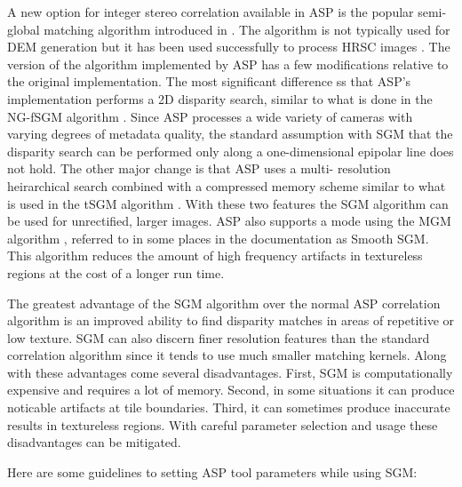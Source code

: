 A new option for integer stereo correlation available in ASP is the 
popular semi-global matching algorithm introduced in 
\citep{hirschmuller_sgm_original}.  The algorithm is not typically used for
DEM generation but it has been used successfully to process HRSC images
\citep{hirschmuller_hrsc_with_sgm}.  The version of the algorithm implemented
by ASP has a few modifications relative to the original implementation.  The
most significant difference ss that ASP's implementation performs a 2D disparity
search, similar to what is done in the NG-fSGM algorithm 
\citep{xiang_2016_low_complexity_fsgm}.  Since ASP processes a wide variety of
cameras with varying degrees of metadata quality, the standard assumption 
with SGM that the disparity search can be performed only along a one-dimensional 
epipolar line does not hold.  The other major change is that ASP uses a multi-
resolution heirarchical search combined with a compressed memory scheme similar
to what is used in the tSGM algorithm \citep{rothermel2012sure_isgm}.  With
these two features the SGM algorithm can be used for unrectified, larger images.
ASP also supports a mode using the MGM algorithm \citep{facciolo2015mgm}, referred to
in some places in the documentation as Smooth SGM.  This algorithm reduces the amount
of high frequency artifacts in textureless regions at the cost of a longer run time.

The greatest advantage of the SGM algorithm over the normal ASP correlation algorithm
is an improved ability to find disparity matches in areas of repetitive or low texture.
SGM can also discern finer resolution features than the standard correlation algorithm
since it tends to use much smaller matching kernels.  Along with these advantages come several disadvantages.
First,  SGM is computationally expensive and requires a lot of memory.  Second, in some
situations it can produce noticable artifacts at tile boundaries.  Third, it can 
sometimes produce inaccurate results in textureless regions.  With careful parameter
selection and usage these disadvantages can be mitigated.

Here are some guidelines to setting ASP tool parameters while using SGM:

